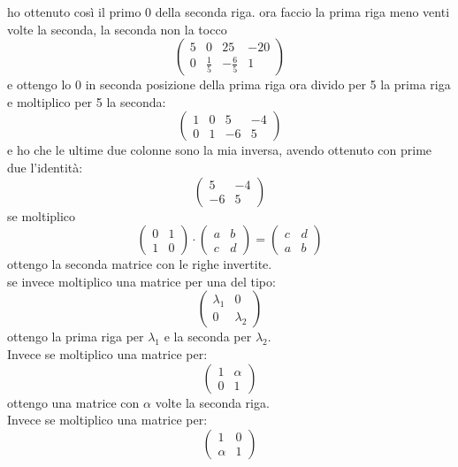 \documentclass[a4paper,12pt, oneside]{book}
\begin{document}
ho ottenuto così  il primo 0 della seconda riga. ora faccio la prima riga meno venti volte la seconda, la seconda non la tocco
$$
	\left(\begin{matrix}
			5 & 0           & 25           & -20 \\
			0 & \frac{1}{5} & -\frac{6}{5} & 1
		\end{matrix}\right)
$$
e ottengo lo 0 in seconda posizione della prima riga
\newpage
ora divido per 5 la prima riga e moltiplico per 5 la seconda:
$$
	\left(\begin{matrix}
			1 & 0 & 5  & -4 \\
			0 & 1 & -6 & 5
		\end{matrix}\right)
$$
e ho che le ultime due colonne sono la mia inversa, avendo ottenuto con prime due l'identità:
$$
	\left(\begin{matrix}
			5  & -4 \\
			-6 & 5
		\end{matrix}\right)
$$
se moltiplico
$$
	\left(\begin{matrix}
			0 & 1 \\
			1 & 0
		\end{matrix}\right)\cdot \left(\begin{matrix}
			a & b \\
			c & d
		\end{matrix}\right)= \left(\begin{matrix}
			c & d \\
			a & b
		\end{matrix}\right)
$$
ottengo la seconda matrice con le righe invertite.\\ se invece moltiplico una matrice per una del tipo:
$$
	\left(\begin{matrix}
			\lambda_1 & 0         \\
			0         & \lambda_2
		\end{matrix}\right)
$$ ottengo la prima riga per $\lambda_1$ e la seconda per $\lambda_2$.\\Invece se moltiplico una matrice per:
$$
	\left(\begin{matrix}
			1 & \alpha \\
			0 & 1
		\end{matrix}\right)
$$
ottengo una matrice con $\alpha$ volte la seconda riga.
\\Invece se moltiplico una matrice per:
$$
	\left(\begin{matrix}
			1      & 0 \\
			\alpha & 1
		\end{matrix}\right)
$$
\end{document}
